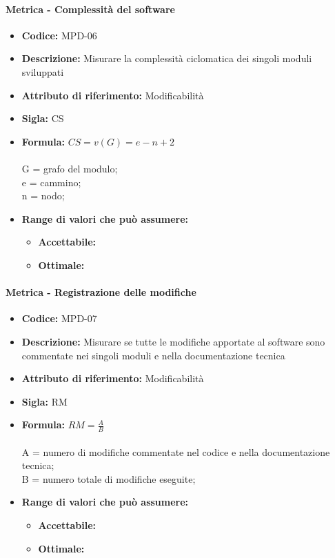            \paragraph{Metrica - Complessità del software} 
              \begin{itemize}
         \item   \textbf{Codice:} MPD-06
         \item   \textbf{Descrizione:} Misurare la complessità ciclomatica dei singoli moduli sviluppati
          \item  \textbf{Attributo di riferimento:} Modificabilità
          \item  \textbf{Sigla:} CS
         \item   \textbf{Formula:} \begin{math}CS = v(G) = e - n + 2 \end{math}\\ \\
            G = grafo del modulo;\\
            e = cammino;\\
            n = nodo; 
               \item \textbf{Range di valori che può assumere:}
        \begin{itemize}
            \item \textbf{Accettabile:} 
            \item \textbf{Ottimale:} 
        \end{itemize}
       \end{itemize}
              

\paragraph{Metrica - Registrazione delle modifiche} 
   \begin{itemize}
          \item  \textbf{Codice:} MPD-07
         \item   \textbf{Descrizione:} Misurare se tutte le modifiche apportate al software sono commentate nei singoli moduli e nella documentazione tecnica
         \item   \textbf{Attributo di riferimento:} Modificabilità
         \item   \textbf{Sigla:} RM
         \item   \textbf{Formula:} \begin{math}RM = \frac{A}{B}\end{math}\\ \\
            A = numero di modifiche commentate nel codice e nella documentazione tecnica;\\
            B = numero totale di modifiche eseguite;
               \item \textbf{Range di valori che può assumere:}
        \begin{itemize}
            \item \textbf{Accettabile:} 
            \item \textbf{Ottimale:} 
        \end{itemize}
       \end{itemize}
              
